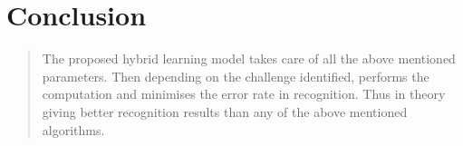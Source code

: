 \section*{Conclusion}
\begin{quote}
The proposed hybrid learning model takes care of all the above mentioned parameters. Then depending on the challenge identified, performs the computation and minimises the error rate in recognition. Thus in theory giving better recognition results than any of the above mentioned algorithms.
\end{quote}
